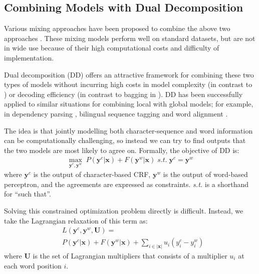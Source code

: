 \subsection{Combining Models with Dual Decomposition} 
Various mixing approaches have been proposed to combine the above two approaches \cite{Wang:2006:SIGHAN,Lin:2009:CICLing,Sun:2009:HLT-NAACL,Sun:2010:COLING,Wang:2010:COLING}. 
These mixing models perform well on standard datasets, but are not in wide use because of their high computational costs and difficulty of implementation.

Dual decomposition (DD) \cite{Rush:2010:EMNLP} offers an attractive framework for combining these two types of models without incurring high costs in model complexity (in contrast to \cite{Sun:2009:HLT-NAACL}) or decoding efficiency (in contrast to bagging in \cite{Wang:2006:SIGHAN,Sun:2010:COLING}). DD has been successfully applied to similar situations for combining local with global models; for example, in dependency parsing \cite{Koo:2010:EMNLP}, bilingual sequence tagging \cite{Wang:2013:ACL} and word alignment \cite{Denero:2011:ACL}.  

The idea is that jointly modelling both character-sequence and word information can be computationally challenging, so instead we can try to find outputs that the two models are most likely to agree on.
Formally, the objective of DD is:
\begin{align}
   \max_{\mathbf{y^\textit{c}}, \mathbf{y^\textit{w}}}  \; P(\mathbf{y^\textit{c}} | \mathbf{x}) + F(\mathbf{y^\textit{w}} | \mathbf{x}) \;  s.t. \; \mathbf{y^\textit{c}} = \mathbf{y^\textit{w}}
\end{align}
\noindent where $\mathbf{y^\textit{c}}$ is the output of character-based CRF, $\mathbf{y^\textit{w}}$ is the output of word-based perceptron, 
and the agreements  are expressed as constraints. \textit{s.t.} is a shorthand for ``such that''.

Solving this constrained optimization problem directly is difficult. 
Instead, we take the Lagrangian relaxation of this term as:
\begin{align}
& L\left(\mathbf{y^\textit{c}}, \mathbf{y^\textit{w}}, \mathbf{U}\right) =  \\ 
& P(\mathbf{y^\textit{c}} | \mathbf{x}) + F(\mathbf{y^\textit{w}} | \mathbf{x}) +  \sum\limits_{i\in |\mathbf{x}|}{u_{i}(y_i^\textit{c}-y_i^\textit{w})}  \nonumber
\end{align}
\noindent where $ \mathbf{U}$ is the set of Lagrangian multipliers that consists of a multiplier $u_i$ at each word position $i$. 


